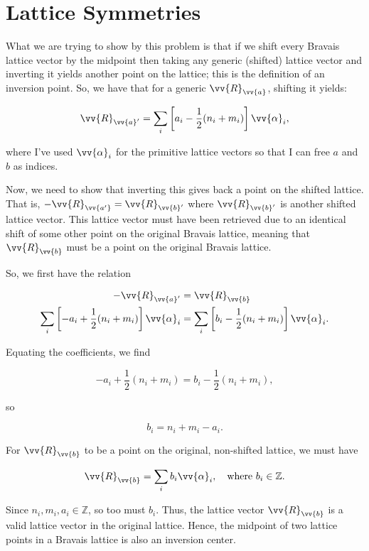 \section{Lattice Symmetries}

\begin{parts}
\item What we are trying to show by this problem is that if we shift every Bravais lattice vector by the midpoint then taking any generic (shifted) lattice vector and inverting it yields another point on the lattice; this is the definition of an inversion point. So, we have that for a generic $\vv{R}_{\vv{a}}$, shifting it yields:

  \begin{equation}
    \vv{R}_{\vv{a}'} = \sum_i \left[ a_i - \frac{1}{2}(n_i + m_i)\right]\vv{\alpha}_i,
  \end{equation}

  where I've used $\vv{\alpha}_i$ for the primitive lattice vectors so that I can free $a$ and $b$ as indices.

  Now, we need to show that inverting this gives back a point on the shifted lattice. That is, $-\vv{R}_{\vv{a'}} = \vv{R}_{\vv{b}'}$ where $\vv{R}_{\vv{b}'}$ is another shifted lattice vector. This lattice vector must have been retrieved due to an identical shift of some other point on the original Bravais lattice, meaning that $\vv{R}_{\vv{b}}$ must be a point on the original Bravais lattice.

  So, we first have the relation

  \begin{align}
    -\vv{R}_{\vv{a}'} &= \vv{R}_{\vv{b}} \\
    \sum_i \left[ -a_i + \frac{1}{2}(n_i + m_i) \right]\vv{\alpha}_i &= \sum_i \left[ b_i - \frac{1}{2}(n_i + m_i) \right]\vv{\alpha}_i.
  \end{align}

  Equating the coefficients, we find

  \begin{equation}
    -a_i + \frac{1}{2}(n_i + m_i) = b_i - \frac{1}{2}(n_i + m_i),
  \end{equation}

  so

  \begin{equation}
    b_i = n_i + m_i - a_i.
  \end{equation}

  For $\vv{R}_{\vv{b}}$ to be a point on the original, non-shifted lattice, we must have

  \begin{equation}
    \vv{R}_{\vv{b}} = \sum_i b_i \vv{\alpha}_i, \quad\text{where}\ b_i \in \mathbb{Z}.
  \end{equation}

  Since $n_i,m_i,a_i \in \mathbb{Z}$, so too must $b_i$. Thus, the lattice vector $\vv{R}_{\vv{b}}$ is a valid lattice vector in the original lattice. Hence, the midpoint of two lattice points in a Bravais lattice is also an inversion center.

\end{parts}




